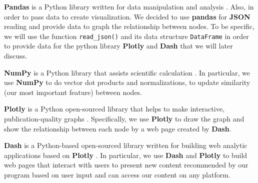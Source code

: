 \documentclass[fontsize=11pt]{article}
\begin{document}
\begin{enumerate}
    \quad \textbf{Pandas} is a Python library written for data manipulation and analysis \citep{Pan21}. Also, in order to pass data to create visualization. We decided to use \textbf{pandas} for \textbf{JSON} reading and provide data to graph the relationship between nodes. To be specific, we will use the function \texttt{read\_json()} and its data structure \texttt{DataFrame} in order to provide data for the python library \textbf{Plotly} and \textbf{\textbf{Dash}} that we will later discuss.
    
    \quad \textbf{NumPy} is a Python library that assists scientific calculation \citep{Pynpy}. In particular, we use \textbf{NumPy} to do vector dot products and normalizations, to update similarity (our most important feature) between nodes.
    
    \quad \textbf{Plotly} is a Python open-sourced library that helps to make interactive, publication-quality graphs \citep{plotly}. Specifically, we use \textbf{Plotly} to draw the graph and show the relationship between each node by a web page created by \textbf{Dash}.
    
    \quad \textbf{Dash} is a Python-based open-sourced library written for building web analytic applications based on \textbf{Plotly} \citep{Dash21}. In particular, we use \textbf{Dash} and \textbf{Plotly} to build web pages that interact with users to present new content recommended by our program based on user input and can access our content on any platform.
    
\end{enumerate}



\end{document}
